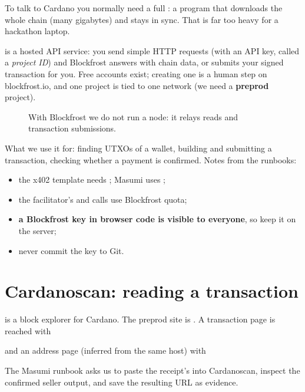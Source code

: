 To talk to Cardano you normally need a full : a program that downloads the whole chain (many gigabytes) and stays in sync. That is far too heavy for a hackathon laptop.

 is a hosted API service: you send simple HTTP requests (with an API key, called a \emph{project ID}) and Blockfrost answers with chain data, or submits your signed transaction for you. Free accounts exist; creating one is a human step on blockfrost.io, and one project is tied to one network (we need a \textbf{preprod} project).

\begin{figure}[h]
\centering
{}
\caption{With Blockfrost we do not run a node: it relays reads and transaction submissions.}
\end{figure}

What we use it for: finding UTXOs of a wallet, building and submitting a transaction, checking whether a payment is confirmed. Notes from the runbooks:
\begin{itemize}
  \item the x402 template needs ; Masumi uses ;
  \item the facilitator's  and  calls use Blockfrost quota;
  \item \textbf{a Blockfrost key in browser code is visible to everyone}, so keep it on the server;
  \item never commit the key to Git.
\end{itemize}

\section{Cardanoscan: reading a transaction}

 is a block explorer for Cardano. The preprod site is . A transaction page is reached with
\begin{center}
\end{center}
and an address page (inferred from the same host) with
\begin{center}
\end{center}
The Masumi runbook asks us to paste the receipt's  into Cardanoscan, inspect the confirmed seller output, and save the resulting URL as evidence.


